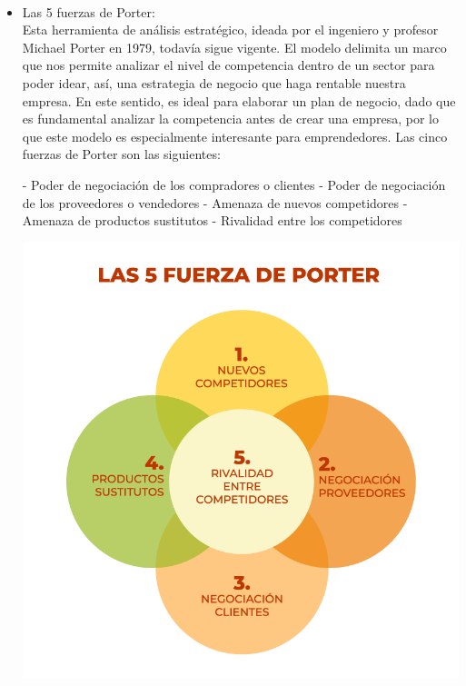 \begin{itemize}
\begin{center}
		\end{center}
	\end{itemize}
	
	\\
\begin{itemize}
\item Las 5 fuerzas de Porter:
\\Esta herramienta de análisis estratégico, ideada por el ingeniero y profesor Michael Porter en 1979, todavía sigue vigente. El modelo delimita un marco que nos permite analizar el nivel de competencia dentro de un sector para poder idear, así, una estrategia de negocio que haga rentable nuestra empresa. En este sentido, es ideal para elaborar un plan de negocio, dado que es fundamental analizar la competencia antes de crear una empresa, por lo que este modelo es especialmente interesante para emprendedores. Las cinco fuerzas de Porter son las siguientes:

- Poder de negociación de los compradores o clientes
- Poder de negociación de los proveedores o vendedores
- Amenaza de nuevos competidores
- Amenaza de productos sustitutos
- Rivalidad entre los competidores
		\begin{center}
		\includegraphics[width=15cm]{./Imagenes/Imagen5}
		\end{center}

	\end{itemize} 
	
